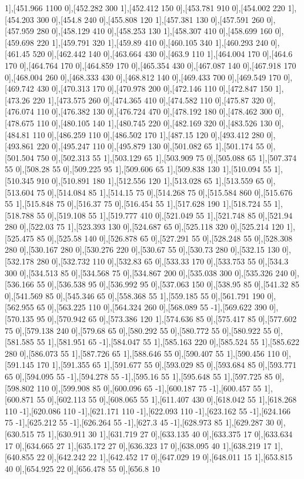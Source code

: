 {1],[451.966 1100 0],[452.282 300 1],[452.412 150 0],[453.781 910 0],[454.002 220 1],[454.203 300 0],[454.8 240 0],[455.808 120 1],[457.381 130 0],[457.591 260 0],[457.959 280 0],[458.129 410 0],[458.253 130 1],[458.307 410 0],[458.699 160 0],[459.698 220 1],[459.791 320 1],[459.89 410 0],[460.105 340 1],[460.293 240 0],[461.45 520 0],[462.442 140 0],[463.664 430 0],[463.9 110 1],[464.004 170 0],[464.6 170 0],[464.764 170 0],[464.859 170 0],[465.354 430 0],[467.087 140 0],[467.918 170 0],[468.004 260 0],[468.333 430 0],[468.812 140 0],[469.433 700 0],[469.549 170 0],[469.742 430 0],[470.313 170 0],[470.978 200 0],[472.146 110 0],[472.847 150 1],[473.26 220 1],[473.575 260 0],[474.365 410 0],[474.582 110 0],[475.87 320 0],[476.074 110 0],[476.382 130 0],[476.724 470 0],[478.192 180 0],[478.462 300 0],[478.675 110 0],[480.105 140 1],[480.745 220 0],[482.169 320 0],[483.526 130 0],[484.81 110 0],[486.259 110 0],[486.502 170 1],[487.15 120 0],[493.412 280 0],[493.861 220 0],[495.247 110 0],[495.879 130 0],[501.082 65 1],[501.174 55 0],[501.504 750 0],[502.313 55 1],[503.129 65 1],[503.909 75 0],[505.088 65 1],[507.374 55 0],[508.28 55 0],[509.225 95 1],[509.606 65 1],[509.838 130 1],[510.094 55 1],[510.345 910 0],[510.891 180 1],[512.556 120 1],[513.028 65 1],[513.559 65 0],[513.604 75 0],[514.084 85 1],[514.15 75 0],[514.268 75 0],[515.584 860 0],[515.676 55 1],[515.848 75 0],[516.37 75 0],[516.454 55 1],[517.628 190 1],[518.724 55 1],[518.788 55 0],[519.108 55 1],[519.777 410 0],[521.049 55 1],[521.748 85 0],[521.94 280 0],[522.03 75 1],[523.393 130 0],[524.687 65 0],[525.118 320 0],[525.214 120 1],[525.475 85 0],[525.58 140 0],[526.878 65 0],[527.291 55 0],[528.248 55 0],[528.308 280 0],[530.167 280 0],[530.276 220 0],[530.67 55 0],[530.73 280 0],[532.15 130 0],[532.178 280 0],[532.732 110 0],[532.83 65 0],[533.33 170 0],[533.753 55 0],[534.3 300 0],[534.513 85 0],[534.568 75 0],[534.867 200 0],[535.038 300 0],[535.326 240 0],[536.166 55 0],[536.538 95 0],[536.992 95 0],[537.063 150 0],[538.95 85 0],[541.32 85 0],[541.569 85 0],[545.346 65 0],[558.368 55 1],[559.185 55 0],[561.791 190 0],[562.955 65 0],[563.225 110 0],[564.324 260 0],[568.089 55 -1],[569.622 390 0],[570.135 95 0],[570.942 65 0],[573.386 120 1],[574.636 85 0],[575.417 85 0],[577.602 75 0],[579.138 240 0],[579.68 65 0],[580.292 55 0],[580.772 55 0],[580.922 55 0],[581.585 55 1],[581.951 65 -1],[584.047 55 1],[585.163 220 0],[585.524 55 1],[585.622 280 0],[586.073 55 1],[587.726 65 1],[588.646 55 0],[590.407 55 1],[590.456 110 0],[591.145 170 1],[591.355 65 1],[591.677 55 0],[593.029 85 0],[593.684 85 0],[593.771 65 0],[594.095 55 -1],[594.278 55 -1],[595.16 55 1],[595.648 55 1],[597.725 85 0],[598.802 110 0],[599.908 85 0],[600.096 65 -1],[600.187 75 -1],[600.457 55 1],[600.871 55 0],[602.113 55 0],[608.065 55 1],[611.407 430 0],[618.042 55 1],[618.268 110 -1],[620.086 110 -1],[621.171 110 -1],[622.093 110 -1],[623.162 55 -1],[624.166 75 -1],[625.212 55 -1],[626.264 55 -1],[627.3 45 -1],[628.973 85 1],[629.287 30 0],[630.515 75 1],[630.911 30 1],[631.719 27 0],[633.135 40 0],[633.375 17 0],[633.634 17 0],[634.665 27 1],[635.172 27 0],[636.323 17 0],[638.095 40 1],[638.219 17 1],[640.855 22 0],[642.242 22 1],[642.452 17 0],[647.029 19 0],[648.011 15 1],[653.815 40 0],[654.925 22 0],[656.478 55 0],[656.8 10 }
